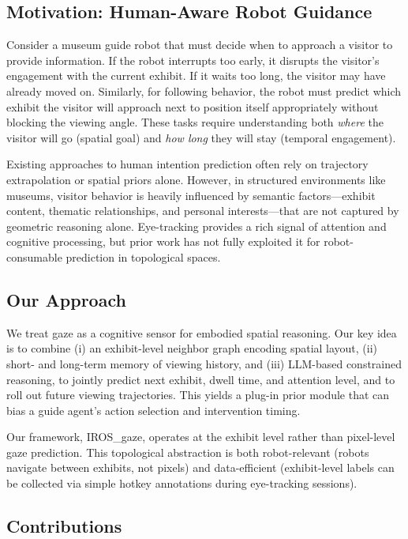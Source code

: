 \documentclass[letterpaper]{article}
\begin{document}
\subsection{Motivation: Human-Aware Robot Guidance}

Consider a museum guide robot that must decide when to approach a visitor to provide information. If the robot interrupts too early, it disrupts the visitor's engagement with the current exhibit. If it waits too long, the visitor may have already moved on. Similarly, for following behavior, the robot must predict which exhibit the visitor will approach next to position itself appropriately without blocking the viewing angle. These tasks require understanding both \textit{where} the visitor will go (spatial goal) and \textit{how long} they will stay (temporal engagement).

Existing approaches to human intention prediction often rely on trajectory extrapolation or spatial priors alone. However, in structured environments like museums, visitor behavior is heavily influenced by semantic factors—exhibit content, thematic relationships, and personal interests—that are not captured by geometric reasoning alone. Eye-tracking provides a rich signal of attention and cognitive processing, but prior work has not fully exploited it for robot-consumable prediction in topological spaces.

\subsection{Our Approach}

We treat gaze as a cognitive sensor for embodied spatial reasoning. Our key idea is to combine (i) an exhibit-level neighbor graph encoding spatial layout, (ii) short- and long-term memory of viewing history, and (iii) LLM-based constrained reasoning, to jointly predict next exhibit, dwell time, and attention level, and to roll out future viewing trajectories. This yields a plug-in prior module that can bias a guide agent's action selection and intervention timing.

Our framework, IROS\_gaze, operates at the exhibit level rather than pixel-level gaze prediction. This topological abstraction is both robot-relevant (robots navigate between exhibits, not pixels) and data-efficient (exhibit-level labels can be collected via simple hotkey annotations during eye-tracking sessions).

\subsection{Contributions}
\end{document}
